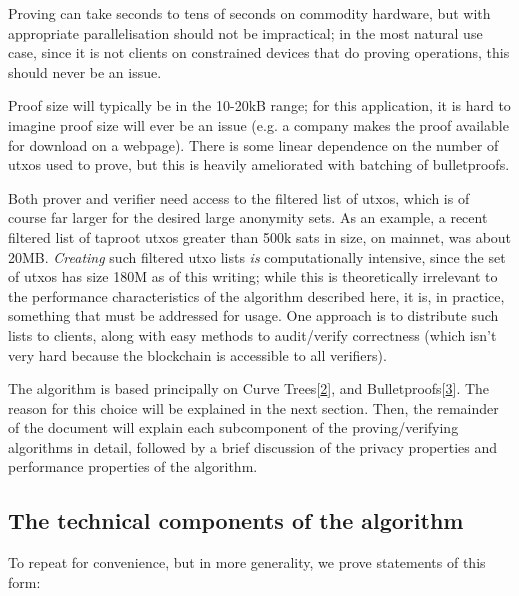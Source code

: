\documentclass[10pt,a4paper]{article}
\begin{document}
\vspace{5 pt}

Proving can take seconds to tens of seconds on commodity hardware, but with appropriate parallelisation should not be impractical; in the most natural use case, since it is not clients on constrained devices that do proving operations, this should never be an issue.

\vspace{5 pt}

Proof size will typically be in the 10-20kB range; for this application, it is hard to imagine proof size will ever be an issue (e.g. a company makes the proof available for download on a webpage). There is some linear dependence on the number of utxos used to prove, but this is heavily ameliorated with batching of bulletproofs.

\vspace{5 pt}

Both prover and verifier need access to the filtered list of utxos, which is of course far larger for the desired large anonymity sets. As an example, a recent filtered list of taproot utxos greater than 500k sats in size, on mainnet, was about 20MB. \emph{Creating} such filtered utxo lists \emph{is} computationally intensive, since the set of utxos has size 180M as of this writing; while this is theoretically irrelevant to the performance characteristics of the algorithm described here, it is, in practice, something that must be addressed for usage. One approach is to distribute such lists to clients, along with easy methods to audit/verify correctness (which isn't very hard because the blockchain is accessible to all verifiers).

\vspace{5 pt}

The algorithm is based principally on Curve Trees{[}\protect\hyperlink{anchor-2}{2}{]}, and Bulletproofs{[}\protect\hyperlink{anchor-3}{3}{]}. The reason for this choice will be explained in the next section. Then, the remainder of the document will explain each subcomponent of the proving/verifying algorithms in detail, followed by a brief discussion of the privacy properties and performance properties of the algorithm.

\subsection{The technical components of the algorithm}

To repeat for convenience, but in more generality, we prove statements of this form:
\end{document}
